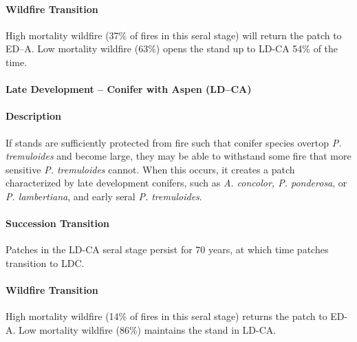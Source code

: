 \paragraph{Wildfire Transition} High mortality wildfire (37\% of fires in this seral stage) will return the patch to ED–A. Low mortality wildfire (63\%) opens the stand up to LD-CA 54\% of the time.

\noindent\hrulefill


\paragraph{Late Development – Conifer with Aspen (LD–CA)}

\paragraph{Description} If stands are sufficiently protected from fire such that conifer species overtop \emph{P. tremuloides} and become large, they may be able to withstand some fire that more sensitive \emph{P. tremuloides} cannot. When this occurs, it creates a patch characterized by late development conifers, such as \emph{A. concolor, P. ponderosa}, or \emph{P. lambertiana}, and early seral \emph{P. tremuloides}. 

\paragraph{Succession Transition} Patches in the LD-CA seral stage persist for 70 years, at which time patches transition to LDC. 

\paragraph{Wildfire Transition} High mortality wildfire (14\% of fires in this seral stage) returns the patch to ED-A. Low mortality wildfire (86\%) maintains the stand in LD-CA. 

\noindent\hrulefill




